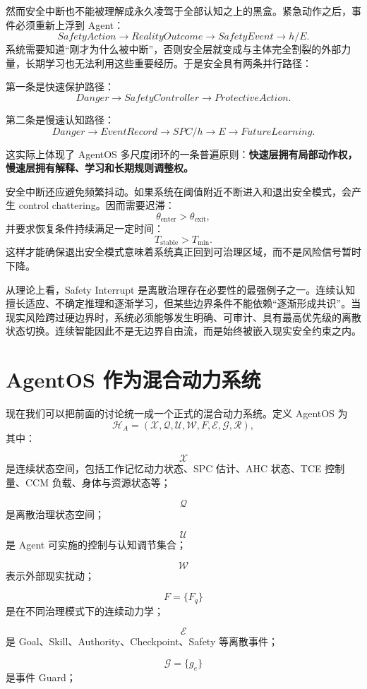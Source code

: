 然而安全中断也不能被理解成永久凌驾于全部认知之上的黑盒。紧急动作之后，事件必须重新上浮到 Agent：
\[
SafetyAction
\rightarrow
RealityOutcome
\rightarrow
SafetyEvent
\rightarrow
h/E.
\]
系统需要知道“刚才为什么被中断”，否则安全层就变成与主体完全割裂的外部力量，长期学习也无法利用这些重要经历。于是安全具有两条并行路径：

第一条是快速保护路径：
\[
Danger
\rightarrow
SafetyController
\rightarrow
ProtectiveAction.
\]

第二条是慢速认知路径：
\[
Danger
\rightarrow
EventRecord
\rightarrow
SPC/h
\rightarrow
E
\rightarrow
FutureLearning.
\]

这实际上体现了 AgentOS 多尺度闭环的一条普遍原则：\textbf{快速层拥有局部动作权，慢速层拥有解释、学习和长期规则调整权。}

安全中断还应避免频繁抖动。如果系统在阈值附近不断进入和退出安全模式，会产生 control chattering。因而需要迟滞：
\[
\theta_{\mathrm{enter}}
>
\theta_{\mathrm{exit}},
\]
并要求恢复条件持续满足一定时间：
\[
T_{\mathrm{stable}}>T_{\min}.
\]
这样才能确保退出安全模式意味着系统真正回到可治理区域，而不是风险信号暂时下降。

从理论上看，Safety Interrupt 是离散治理存在必要性的最强例子之一。连续认知擅长适应、不确定推理和逐渐学习，但某些边界条件不能依赖“逐渐形成共识”。当现实风险跨过硬边界时，系统必须能够发生明确、可审计、具有最高优先级的离散状态切换。连续智能因此不是无边界自由流，而是始终被嵌入现实安全约束之内。

\section{AgentOS 作为混合动力系统}

现在我们可以把前面的讨论统一成一个正式的混合动力系统。定义 AgentOS 为
\[
\mathcal H_A
=
(
\mathcal X,
\mathcal Q,
\mathcal U,
\mathcal W,
F,
\mathcal E,
\mathcal G,
\mathcal R
),
\]
其中：

\[
\mathcal X
\]
是连续状态空间，包括工作记忆动力状态、SPC 估计、AHC 状态、TCE 控制量、CCM 负载、身体与资源状态等；

\[
\mathcal Q
\]
是离散治理状态空间；

\[
\mathcal U
\]
是 Agent 可实施的控制与认知调节集合；

\[
\mathcal W
\]
表示外部现实扰动；

\[
F=\{F_q\}
\]
是在不同治理模式下的连续动力学；

\[
\mathcal E
\]
是 Goal、Skill、Authority、Checkpoint、Safety 等离散事件；

\[
\mathcal G=\{g_e\}
\]
是事件 Guard；

